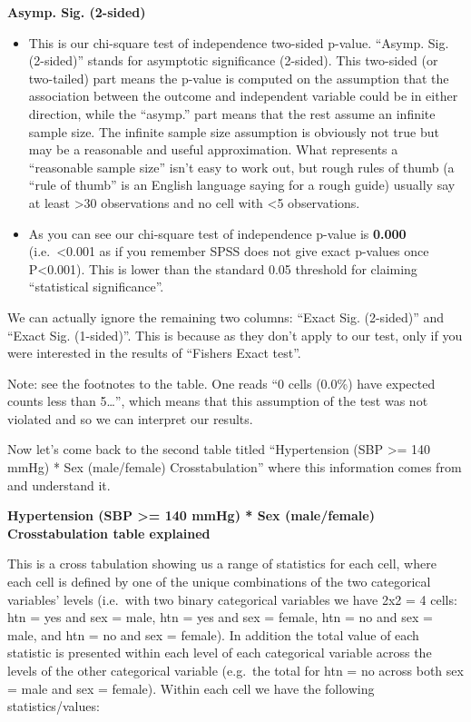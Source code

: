 \documentclass[
]{book}
\begin{document}
\textbf{Asymp. Sig. (2-sided)}

\begin{itemize}
\item
  This is our chi-square test of independence two-sided p-value. ``Asymp. Sig. (2-sided)'' stands for asymptotic significance (2-sided). This two-sided (or two-tailed) part means the p-value is computed on the assumption that the association between the outcome and independent variable could be in either direction, while the ``asymp.'' part means that the rest assume an infinite sample size. The infinite sample size assumption is obviously not true but may be a reasonable and useful approximation. What represents a ``reasonable sample size'' isn't easy to work out, but rough rules of thumb (a ``rule of thumb'' is an English language saying for a rough guide) usually say at least \textgreater30 observations and no cell with \textless5 observations.
\item
  As you can see our chi-square test of independence p-value is \textbf{0.000} (i.e.~\textless0.001 as if you remember SPSS does not give exact p-values once P\textless0.001). This is lower than the standard 0.05 threshold for claiming ``statistical significance''.
\end{itemize}

We can actually ignore the remaining two columns: ``Exact Sig. (2-sided)'' and ``Exact Sig. (1-sided)''. This is because as they don't apply to our test, only if you were interested in the results of ``Fishers Exact test''.

Note: see the footnotes to the table. One reads ``0 cells (0.0\%) have expected counts less than 5\ldots{}'', which means that this assumption of the test was not violated and so we can interpret our results.

Now let's come back to the second table titled ``Hypertension (SBP \textgreater= 140 mmHg) * Sex (male/female) Crosstabulation'' where this information comes from and understand it.

\textbf{Hypertension (SBP \textgreater= 140 mmHg) * Sex (male/female) Crosstabulation table explained}

This is a cross tabulation showing us a range of statistics for each cell, where each cell is defined by one of the unique combinations of the two categorical variables' levels (i.e.~with two binary categorical variables we have 2x2 = 4 cells: htn = yes and sex = male, htn = yes and sex = female, htn = no and sex = male, and htn = no and sex = female). In addition the total value of each statistic is presented within each level of each categorical variable across the levels of the other categorical variable (e.g.~the total for htn = no across both sex = male and sex = female). Within each cell we have the following statistics/values:
\end{document}
